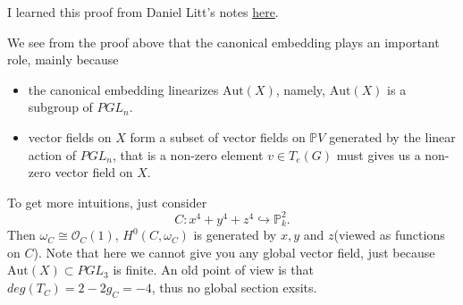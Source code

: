 \documentclass[../main.tex]{subfiles}
\begin{document}
\begin{remark}
I learned this proof from Daniel Litt's notes \href{https://static1.squarespace.com/static/57bf2a6de3df281593b7f57d/t/57bf698ff7e0abe0fdca085a/1472162191829/curve-automorphisms.pdf}{here}.
\end{remark}
\begin{remark}
We see from the proof above that the canonical embedding plays an important role, mainly because  
\begin{itemize}
\item the canonical embedding linearizes $\mathrm{Aut}(X)$, namely, $\mathrm{Aut}(X)$ is a subgroup of $PGL_{n}$.
\item vector fields on $X$ form a subset of vector fields on $\mathbb{P}V$ generated by the linear action of $PGL_{n}$, that is a non-zero element $v\in T_{e}(G)$ must gives us a non-zero vector field on $X$.
\end{itemize}
To get more intuitions, just consider 
$$C: x^{4}+y^{4}+z^{4}\hookrightarrow \mathbb{P}^{2}_{k}.$$
Then $\omega_{C}\cong \mathcal{O}_{C}(1)$, $H^{0}(C,\omega_{C})$ is generated by $x,y$ and $z$(viewed as functions on $C$). Note that here we cannot give you any global vector field, just because $\mathrm{Aut}(X)\subset PGL_{3}$ is finite. An old point of view is that $deg(T_{C})=2-2g_{C}=-4$, thus no global section exsits.
\end{remark}
\end{document}
